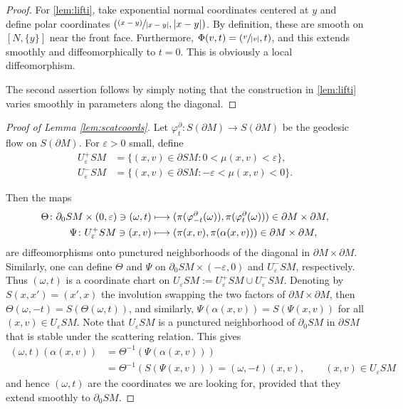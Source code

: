 \documentclass[JEP,XML,SOM,Unicode,NoFloatCountersInSection, NoEqCountersInSection,published]{cedram}
\newcommand{\psfrac}[2]{\sfrac{(#1)}{#2}}
\def\mto{\mathchoice{\longmapsto}{\mapsto}{\mapsto}{\mapsto}}
\theoremstyle{plain}
\theoremstyle{definition}
\theoremstyle{remark}
\begin{document}
\begin{proof} For \eqref{lem:lifti}, take exponential normal coordinates centered at $y$ and define \hbox{polar} coordinates $(\psfrac{x-y}{|x-y|}, |x-y|)$.
By definition, these are smooth on $[N,\{y\}]$ near the front face. Furthermore, $\Phi(v,t) = (\sfrac{v}{|v|},t)$, and this
extends smoothly and diffeomorphically to $t=0$. This is obviously a local diffeomorphism.

The second assertion follows by simply noting that the construction in \eqref{lem:lifti} varies smoothly in parameters along
the diagonal.
\end{proof}

\begin{proof}[Proof of Lemma \ref{lem:scatcoords}]
Let $\varphi_t^\partial\colon S(\partial M) \to S(\partial M)$ be the geodesic flow on $S(\partial M)$. For $\varepsilon > 0$ small,
define
\begin{align*}
U_\varepsilon^+ SM &= \{(x,v) \in \partial SM: 0 < \mu(x,v) < \varepsilon\}, \\
U_\varepsilon^- SM &= \{(x,v) \in \partial SM: -\varepsilon < \mu(x,v)
< 0\}.
\end{align*}

Then the maps
\begin{align*}
\Theta \colon \partial_0 SM\times (0,\varepsilon) \ni (\omega,t) &\mto (\pi (\varphi_{-t}^\partial (\omega)),
\pi (\varphi_{t}^\partial (\omega))) \in \partial M\times \partial M, \\
\Psi \colon U_\varepsilon^+SM \ni (x,v) &\mto (\pi(x,v), \pi (\alpha(x,v))) \in \partial M\times \partial M,
\end{align*}
are diffeomorphisms onto punctured neighborhoods of the diagonal in $\partial M\times \partial M$. Similarly, one can
define $\Theta$ and $\Psi$ on $\partial_0 SM\times (-\varepsilon,0)$ and $U_\varepsilon^- SM$, respectively. Thus
$(\omega,t)$ is a coordinate chart on $U_\varepsilon SM := U_\varepsilon^+ SM \cup U_\varepsilon^- SM$. Denoting by $S(x,x') = (x',x)$ the involution swapping the two factors of $\partial M\times \partial M$, then $\Theta(\omega,-t) = S(\Theta(\omega,t))$, and similarly, $\Psi(\alpha(x,v)) = S(\Psi (x,v))$ for all $(x,v)\in U_\varepsilon SM$. Note that $U_\varepsilon SM$ is a punctured neighborhood of $\partial_0 SM$ in $\partial SM$ that is stable under the scattering relation. This gives
\begin{equation}
\begin{split}
(\omega,t) (\alpha(x,v)) &= \Theta^{-1} (\Psi (\alpha(x,v))) \\
&= \Theta^{-1} (S(\Psi(x,v))) = (\omega,-t)(x,v), \qquad (x,v)\in U_\varepsilon SM
\end{split}
\label{eq:proptomega}
\end{equation}
and hence $(\omega,t)$ are the coordinates we are looking for, provided that they extend smoothly to $\partial_0 SM$.


\end{proof}
\end{document}
